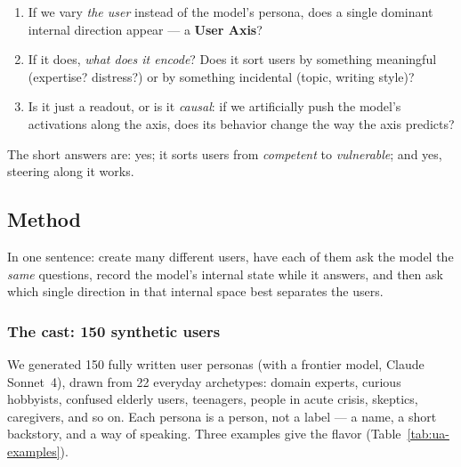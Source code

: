 \documentclass[11pt]{article}
\begin{document}
\begin{enumerate}
  \item If we vary \emph{the user} instead of the model's persona, does a single
        dominant internal direction appear --- a \textbf{User Axis}?
  \item If it does, \emph{what does it encode}? Does it sort users by something
        meaningful (expertise? distress?) or by something incidental (topic,
        writing style)?
  \item Is it just a readout, or is it \emph{causal}: if we artificially push
        the model's activations along the axis, does its behavior change the way
        the axis predicts?
\end{enumerate}

The short answers are: yes; it sorts users from \emph{competent} to
\emph{vulnerable}; and yes, steering along it works.

\subsection{Method}

In one sentence: create many different users, have each of them ask
the model the \emph{same} questions, record the model's internal state while it
answers, and then ask which single direction in that internal space best
separates the users.

\subsubsection{The cast: 150 synthetic users}

We generated 150 fully written user personas (with a frontier model, Claude
Sonnet~4), drawn from 22 everyday archetypes: domain experts, curious hobbyists,
confused elderly users, teenagers, people in acute crisis, skeptics, caregivers,
and so on. Each persona is a person, not a label --- a name, a short backstory,
and a way of speaking. Three examples give the flavor
(Table~\ref{tab:ua-examples}).
\end{document}
